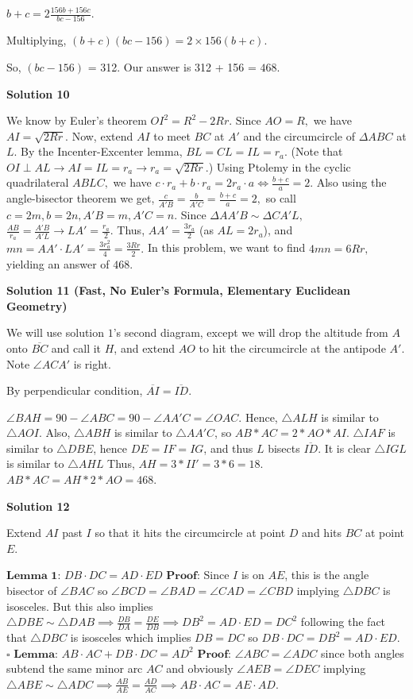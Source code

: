 \begin{enumerate}
 $b+c = 2\frac{156b+156c}{bc-156}$.

 Multiplying, $(b+c)(bc-156) = 2 \times 156(b+c).$ 

 So, $(bc-156)$ = 312. Our answer is 312 + 156 = $\boxed{468}$.

 



\textbf{Solution 10}

We know by Euler's theorem $OI^2=R^2-2Rr.$ Since $AO=R,$ we have $AI=\sqrt{2Rr}.$ Now, extend $AI$ to meet $BC$ at $A'$ and the circumcircle of $\Delta ABC$ at $L.$ By the Incenter-Excenter lemma, $BL=CL=IL=r_a.$ (Note that $OI \perp AL \rightarrow AI=IL=r_a\rightarrow r_a=\sqrt{2Rr}.$) Using Ptolemy in the cyclic quadrilateral $ABLC,$ we have $c\cdot r_a+b\cdot r_a=2r_a\cdot a \iff \frac{b+c}{a}=2.$ Also using the angle-bisector theorem we get, $\frac{c}{A'B}=\frac{b}{A'C}=\frac{b+c}{a}=2,$ so call $c=2m, b=2n, A'B=m, A'C=n.$ Since $\Delta AA'B \sim \Delta CA'L,$ $\frac{AB}{r_a}=\frac{A'B}{A'L}\rightarrow LA'=\frac{r_a}{2}.$ Thus, $AA'=\frac{3r_a}{2}$ (as $AL=2r_a$), and $mn=AA'\cdot LA'=\frac{3r_a^2}{4}=\frac{3Rr}{2}.$ In this problem, we want to find $4mn=6Rr,$ yielding an answer of $\boxed{468}.$




\textbf{Solution 11 (Fast, No Euler's Formula, Elementary Euclidean Geometry)}

We will use solution $1$'s second diagram, except we will drop the altitude from $A$ onto $\overline{BC}$ and call it $H$, and extend $AO$ to hit the circumcircle at the antipode $A'$. Note $\angle ACA'$ is right. 

 By perpendicular condition, $\overline{AI}=\overline{ID}$. 

 $\angle BAH=90 - \angle ABC = 90- \angle AA'C= \angle OAC$. Hence, $\triangle ALH$ is similar to  $\triangle AOI$. Also, $\triangle ABH$ is similar to $\triangle AA'C$, so $AB*AC=2*AO*AI$. $\triangle IAF$ is similar to $\triangle DBE$, hence $DE=IF=IG$, and thus $L$ bisects $\overline{ID}$. It is clear $\triangle IGL$ is similar to $\triangle AHL$ Thus, $AH=3*II' = 3*6 = 18$. $AB*AC = AH*2*AO = \boxed{468}$.

 



\textbf{Solution 12}

Extend $AI$ past $I$ so that it hits the circumcircle at point $D$ and hits $BC$ at point $E$.

 $\textbf{Lemma 1}$: $DB \cdot DC = AD \cdot ED$
$\textbf{Proof}$: Since $I$ is on $AE$, this is the angle bisector of $\angle BAC$ so $\angle BCD = \angle BAD = \angle CAD = \angle CBD$ implying $\triangle DBC$ is isosceles. But this also implies $\triangle DBE \sim \triangle DAB \implies \frac{DB}{DA} = \frac{DE}{DB} \implies DB^2 = AD \cdot ED = DC^2$ following the fact that $\triangle DBC$ is isosceles which implies $DB = DC$ so $DB \cdot DC = DB^2 = AD \cdot ED$. $\square$
$\textbf{Lemma}$: $AB \cdot AC + DB \cdot DC = AD^2$
$\textbf{Proof}$: $\angle ABC = \angle ADC$ since both angles subtend the same minor arc $AC$ and obviously $\angle AEB = \angle DEC$ implying $\triangle ABE \sim \triangle ADC \implies \frac{AB}{AE} = \frac{AD}{AC} \implies AB \cdot AC = AE \cdot AD$.


\end{enumerate}
